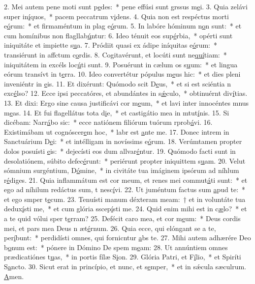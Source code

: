 2. Mei autem pene moti sunt p\uline{e}des:~* pene effúsi sunt grssus m\uline{e}i.
3. Quia zelávi super in\uline{í}quos,~* pacem peccatrum v\uline{i}dens.
4. Quia non est respéctus morti e\uline{ó}rum:~* et firmaméntum in plag e\uline{ó}rum.
5. In labóre hóminum n\uline{o}n sunt:~* et cum homínibus non flagllab\uline{ú}ntur:
6. Ideo ténuit eos sup\uline{é}rbia,~* opérti sunt iniquitáte et impiette s\uline{u}a.
7. Pródiit quasi ex ádipe iníquitas e\uline{ó}rum:~* transiérunt in affctum c\uline{o}rdis.
8. Cogitavérunt, et locúti sunt ne\uline{quí}tiam:~* iniquitátem in excéls loc\uline{ú}ti sunt.
9. Posuérunt in cælum os s\uline{u}um:~* et lingua eórum transívt in t\uline{e}rra.
10. Ideo convertétur pópulus m\uline{e}us hic:~* et dies pleni inveniéntr in \uline{e}is.
11. Et dixérunt: Quómodo scit D\uline{e}us,~* et si est sciéntia n exc\uline{é}lso?
12. Ecce ipsi peccatóres, et abundántes in s\uline{ǽ}culo,~* obtinuérnt div\uline{í}tias.
13. Et dixi: Ergo sine causa justificávi cor m\uline{e}um,~* et lavi inter innocéntes mnus m\uline{e}as.
14. Et fui flagellátus tota d\uline{i}e,~* et castigátio mea in mtut\uline{í}nis.
15. Si dicébam: Narr\uline{á}bo sic:~* ecce natiónem filiórum tuórum rprob\uline{á}vi.
16. Existimábam ut cognóscer\uline{e}m hoc,~* labr est \uline{a}nte me.
17. Donec intrem in Sanctuárium D\uline{e}i:~* et intélligam in novíssims e\uline{ó}rum.
18. Verúmtamen propter dolos posuísti \uline{e}is:~* dejecísti eos dum allvar\uline{é}ntur.
19. Quómodo facti sunt in desolatiónem, súbito defec\uline{é}runt:~* periérunt propter iniquittem s\uline{u}am.
20. Velut sómnium surgéntium, D\uline{ó}mine,~* in civitáte tua imáginem ipsórum ad níhlum r\uline{é}diges.
21. Quia inflammátum est cor meum, et renes mei commut\uline{á}ti sunt:~* et ego ad níhilum redáctus sum, t nesc\uline{í}vi.
22. Ut juméntum factus sum \uline{a}pud te:~* et ego smper t\uline{e}cum.
23. Tenuísti manum déxteram meam:~† et in voluntáte tua dedux\uline{í}sti me,~* et cum glória sscep\uline{í}sti me.
24. Quid enim mihi est in c\uline{æ}lo?~* et a te quid vólui sper t\uline{e}rram?
25. Defécit caro mea, et cor m\uline{e}um:~* Deus cordis mei, et pars mea Deus n æt\uline{é}rnum.
26. Quia ecce, qui elóngant se a te, per\uline{í}bunt:~* perdidísti omnes, qui fornicntur \uline{a}bs te.
27. Mihi autem adhærére Deo b\uline{o}num est:~* pónere in Dómino De spem m\uline{e}am:
28. Ut annúntiem omnes prædicatiónes t\uline{u}as,~* in portis fílæ S\uline{i}on.
29. Glória Patri, et F\uline{í}lio,~* et Spiríti S\uline{a}ncto.
30. Sicut erat in princípio, et nunc, et s\uline{e}mper,~* et in sǽcula sæculrum. \uline{A}men.

